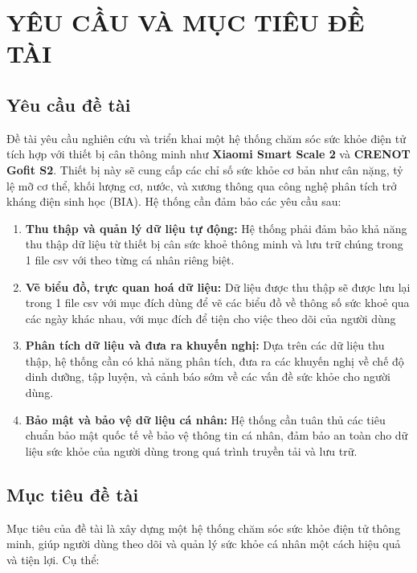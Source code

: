 \section{YÊU CẦU VÀ MỤC TIÊU ĐỀ TÀI}
\subsection{Yêu cầu đề tài}
Đề tài yêu cầu nghiên cứu và triển khai một hệ thống chăm sóc sức khỏe điện tử tích hợp với thiết bị cân thông minh như \textbf{Xiaomi Smart Scale 2} và \textbf{CRENOT Gofit S2}. Thiết bị này sẽ cung cấp các chỉ số sức khỏe cơ bản như cân nặng, tỷ lệ mỡ cơ thể, khối lượng cơ, nước, và xương thông qua công nghệ phân tích trở kháng điện sinh học (BIA). Hệ thống cần đảm bảo các yêu cầu sau:

\begin{enumerate}
    \item \textbf{Thu thập và quản lý dữ liệu tự động:} Hệ thống phải đảm bảo khả năng thu thập dữ liệu từ thiết bị cân sức khoẻ thông minh và lưu trữ chúng trong 1 file csv với theo từng cá nhân riêng biệt.
    \item \textbf{Vẽ biểu đồ, trực quan hoá dữ liệu:} Dữ liệu được thu thập sẽ được lưu lại trong 1 file csv với mục đích dùng để vẽ các biểu đồ về thông số sức khoẻ qua các ngày khác nhau, với mục đích để tiện cho việc theo dõi của người dùng
    \item \textbf{Phân tích dữ liệu và đưa ra khuyến nghị:} Dựa trên các dữ liệu thu thập, hệ thống cần có khả năng phân tích, đưa ra các khuyến nghị về chế độ dinh dưỡng, tập luyện, và cảnh báo sớm về các vấn đề sức khỏe cho người dùng.
    \item \textbf{Bảo mật và bảo vệ dữ liệu cá nhân:} Hệ thống cần tuân thủ các tiêu chuẩn bảo mật quốc tế về bảo vệ thông tin cá nhân, đảm bảo an toàn cho dữ liệu sức khỏe của người dùng trong quá trình truyền tải và lưu trữ.
\end{enumerate}

\subsection{Mục tiêu đề tài}
Mục tiêu của đề tài là xây dựng một hệ thống chăm sóc sức khỏe điện tử thông minh, giúp người dùng theo dõi và quản lý sức khỏe cá nhân một cách hiệu quả và tiện lợi. Cụ thể:

